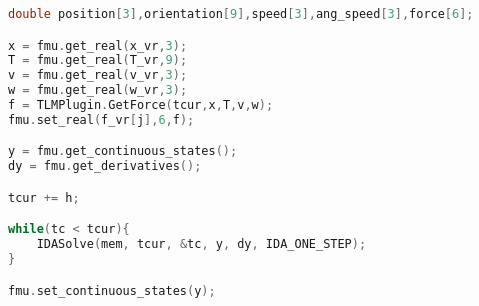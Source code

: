 \documentclass[11pt,a4paper]{report}
\begin{document}
\begin{lstlisting}[float, language=c++, basicstyle=\ttfamily\small,floatplacement=ht,caption=Blabla,label=lst:wrapper_me]
double position[3],orientation[9],speed[3],ang_speed[3],force[6];

x = fmu.get_real(x_vr,3);
T = fmu.get_real(T_vr,9);
v = fmu.get_real(v_vr,3);
w = fmu.get_real(w_vr,3);
f = TLMPlugin.GetForce(tcur,x,T,v,w);
fmu.set_real(f_vr[j],6,f);

y = fmu.get_continuous_states();
dy = fmu.get_derivatives();

tcur += h;

while(tc < tcur){
    IDASolve(mem, tcur, &tc, y, dy, IDA_ONE_STEP);
}

fmu.set_continuous_states(y);
\end{lstlisting}



\end{document}
